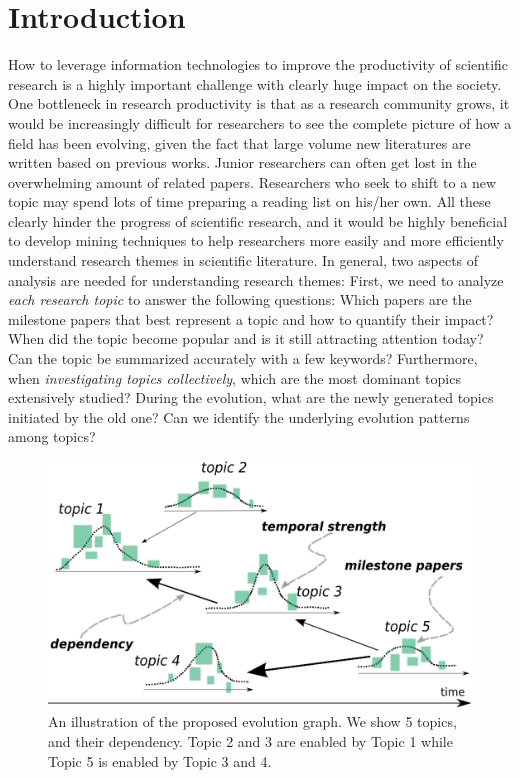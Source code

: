\section{Introduction}

How to leverage information technologies to improve the  productivity of
scientific research is a highly important challenge with clearly huge impact on
the society. One bottleneck in research productivity is that as a research
community grows, it would be increasingly difficult for researchers to see the
complete picture of how a field has been evolving, given the fact that large
volume new literatures are written based on previous works. Junior researchers
can often get lost in the overwhelming amount of related papers. Researchers who
seek to shift to a new topic may spend lots of time preparing a reading list on
his/her own. All these clearly hinder the progress of scientific research, and
it would be highly beneficial to develop mining techniques to help researchers
more easily and more efficiently  understand research themes in scientific
literature.  In general, two aspects of analysis are needed for understanding
research themes: First, we need to analyze \emph{each research topic} to answer
the following questions: Which papers are the milestone papers that best
represent a topic and how to quantify their impact?  When did the topic become
popular and is it still attracting attention today?  Can the topic be summarized
accurately with a few keywords?  Furthermore, when \emph{investigating topics
collectively}, which are the most dominant topics extensively studied?  During
the evolution, what are the newly generated topics initiated by the old one?
Can we identify the underlying evolution patterns among topics?

\begin{figure}[h!]
  \begin{center}
    \includegraphics[scale= .6]{citation-lda/plot/fake_theme.eps}
  \end{center}
  \caption{An illustration of the proposed evolution graph. We show 5 topics,
  and their dependency. Topic 2 and 3 are enabled by Topic 1 while Topic 5 is
  enabled by Topic 3 and 4.}
  \label{fig::fake}
\end{figure}

